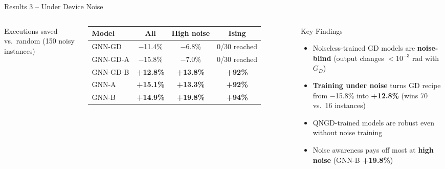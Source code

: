 \documentclass[aspectratio=169,11pt]{beamer}
\newcommand{\up}[1]{\textcolor{GoodGreen}{\textbf{#1}}}
\newcommand{\dn}[1]{\textcolor{BadRed}{#1}}
\begin{document}
\begin{frame}{Results 3 -- Under Device Noise}
  \begin{columns}[T,onlytextwidth]
    \centering\scriptsize
    Executions saved vs.\ random (150 noisy instances)\\[1mm]
    \begin{tabular}{lccc}
      \toprule
      Model & All & High noise & Ising \\
      \midrule
      GNN-GD   & \dn{$-$11.4\%} & \dn{$-$6.8\%} & \dn{0/30 reached} \\
      GNN-GD-A & \dn{$-$15.8\%} & \dn{$-$7.0\%} & \dn{0/30 reached} \\
      GNN-GD-B & \up{+12.8\%} & \up{+13.8\%} & \up{+92\%} \\
      GNN-A    & \up{+15.1\%} & \up{+13.3\%} & \up{+92\%} \\
      GNN-B    & \up{+14.9\%} & \up{+19.8\%} & \up{+94\%} \\
      \bottomrule
    \end{tabular}
    \begin{block}{Key Findings}
      \begin{itemize}\scriptsize
        \item Noiseless-trained GD models are \textbf{noise-blind} (output changes $<10^{-3}$ rad with $G_D$)
        \item \textbf{Training under noise} turns GD recipe from \dn{$-$15.8\%} into \up{+12.8\%}
              (wins 70 vs.\ 16 instances)
        \item QNGD-trained models are robust even without noise training
        \item Noise awareness pays off most at \textbf{high noise} (GNN-B \up{+19.8\%})
      \end{itemize}
    \end{block}
  \end{columns}
\end{frame}
\end{document}

